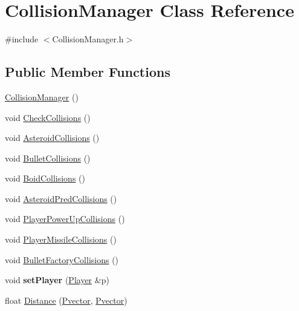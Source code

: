 \hypertarget{class_collision_manager}{}\section{Collision\+Manager Class Reference}
\label{class_collision_manager}


{\ttfamily \#include $<$Collision\+Manager.\+h$>$}

\subsection*{Public Member Functions}
\begin{DoxyCompactItemize}
\item 
\hyperlink{class_collision_manager_a81f0b3f0cc0268c80f54714cd7ddb55f}{Collision\+Manager} ()
\item 
void \hyperlink{class_collision_manager_aa1c1b2c09960c0bad6b9c980324f9f92}{Check\+Collisions} ()
\item 
void \hyperlink{class_collision_manager_a3b8aaa6390c3f6180a5a0249f056b7c0}{Asteroid\+Collisions} ()
\item 
void \hyperlink{class_collision_manager_a43ae00d17f886cf3907b3afc128bffbb}{Bullet\+Collisions} ()
\item 
void \hyperlink{class_collision_manager_ad4be439c8a229dc80aa62626ddf59719}{Boid\+Collisions} ()
\item 
void \hyperlink{class_collision_manager_a25b561a8f6e4d3a3acf189f906ba98b4}{Asteroid\+Pred\+Collisions} ()
\item 
void \hyperlink{class_collision_manager_a274813dccff41e23538606229dc976e5}{Player\+Power\+Up\+Collisions} ()
\item 
void \hyperlink{class_collision_manager_a3ae0d2b33bc8e256a50e5646b794b83d}{Player\+Missile\+Collisions} ()
\item 
void \hyperlink{class_collision_manager_a99dd76e84b4fa2f2fa03f4b72b5a191b}{Bullet\+Factory\+Collisions} ()
\item 
void {\bfseries set\+Player} (\hyperlink{class_player}{Player} \&p)\hypertarget{class_collision_manager_abb793fa039b78ec6f817c58d1bac6391}{}\label{class_collision_manager_abb793fa039b78ec6f817c58d1bac6391}

\item 
float \hyperlink{class_collision_manager_a867cc7c35792a6bc65efbae9cd82fcc4}{Distance} (\hyperlink{class_pvector}{Pvector}, \hyperlink{class_pvector}{Pvector})
\end{DoxyCompactItemize}
